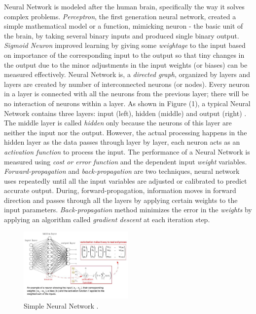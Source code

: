 \documentclass[sigconf]{acmart}
\begin{document}
	Neural Network is modeled after the human brain, specifically the way it solves complex problems. {\em Perceptron}, the first generation neural network, created a simple mathematical model or a function, mimicking neuron - the basic unit of the brain, by taking several binary inputs and produced single binary output. {\em Sigmoid Neuron} improved learning by giving some {\em weightage} to the input based on importance of the corresponding input to the output so that tiny changes in the output due to the minor adjustments in the input weights (or biases) can be measured effectively. Neural Network is, a {\em directed graph}, organized by layers and layers are created by number of interconnected neurons (or nodes). Every neuron in a layer is connected with all the neurons from the previous layer; there will be no interaction of neurons within a layer. As shown in Figure (1), a typical Neural Network contains three layers: input (left), hidden (middle) and output (right) \cite{Goodfellow2016}. The middle layer is called {\em hidden} only because the neurons of this layer are neither the input nor the output. However, the actual processing happens in the hidden layer as the data passes through layer by layer, each neuron acts as an {\em activation function} to process the input. The performance of a Neural Network is measured using {\em cost or error function} and the dependent input {\em weight} variables. {\em Forward-propagation} and {\em back-propagation} are two techniques, neural network uses repeatedly until all the input variables are adjusted or calibrated to predict accurate output. During, forward-propagation, information moves in forward direction and passes through all the layers by applying certain weights to the input parameters. {\em Back-propagation} method minimizes the error in the {\em weights} by applying an algorithm called {\em gradient descent} at each iteration step. 	


	\begin{figure}
		\centering
		\includegraphics[width=0.5\textwidth]{images/neuralnetwork}
		\caption{Simple Neural Network \cite{Goodfellow2016, Gupta2017}.} \label{fig:figure1} 
	\end{figure}
\end{document}
